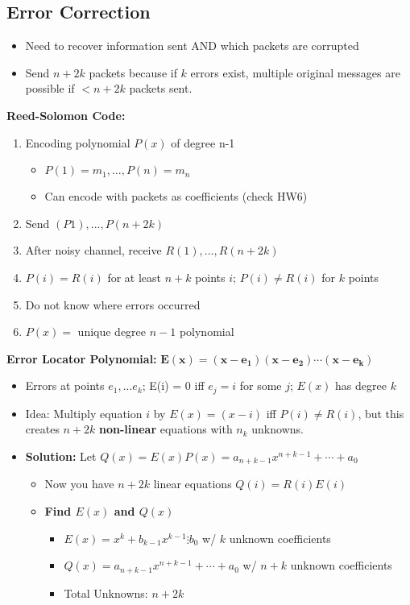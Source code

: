 \documentclass{article}\usepackage{amsmath,amssymb,amsthm,tikz,tkz-graph,color,chngpage,soul,hyperref,csquotes,graphicx,floatrow}\newcommand*{\QEDB}{\hfill\ensuremath{\square}}\newtheorem*{prop}{Proposition}\renewcommand{\theenumi}{\alph{enumi}}\usepackage[shortlabels]{enumitem}\usepackage[nobreak=true]{mdframed}\usetikzlibrary{matrix,calc}\MakeOuterQuote{"}\usepackage[margin=0.75in]{geometry} \newtheorem{theorem}{Theorem}
\begin{document}
\subsection*{Error Correction}
\begin{itemize}
\item Need to recover information sent AND which packets are corrupted
\item Send $n+2k$ packets because if $k$ errors exist, multiple original messages are possible if $< n+2k$ packets sent.
\end{itemize}
\begin{mdframed}
\textbf{Reed-Solomon Code:}
\begin{enumerate}[1.]
\item Encoding polynomial $P(x)$ of degree n-1
    \begin{itemize}
    \item $P(1) = m_1,..., P(n) = m_n$
    \item Can encode with packets as coefficients (check HW6)
    \end{itemize}
\item Send $(P1), ..., P(n+2k)$
\item After noisy channel, receive $R(1), ..., R(n+2k)$
\item $P(i) = R(i)$ for at least $n+k$ points $i$; $P(i) \ne R(i)$ for $k$ points
\item Do not know where errors occurred
\item $P(x) =$ unique degree $n-1$ polynomial
\end{enumerate}
\textbf{Error Locator Polynomial:} $\boldsymbol{E(x)=(x-e_1)(x-e_2)\cdots(x-e_k)}$
\begin{itemize}
\item Errors at points $e_1, ... e_k$; E(i) = 0 iff $e_j = i$ for some $j$; $E(x)$ has degree $k$
\item Idea: Multiply equation $i$ by $E(x) = (x - i)$ iff $P(i) \ne R(i)$, but this creates $n+2k$ \textbf{non-linear} equations with $n_k$ unknowns.
\item \textbf{Solution:} Let $Q(x) = E(x)P(x) = a_{n+k-1}x^{n+k-1} + \cdots + a_0$
    \begin{itemize}
    \item Now you have $n+2k$ linear equations $Q(i) = R(i)E(i)$
    \item \textbf{Find $E(x)$ and $Q(x)$}
        \begin{itemize}
            \item $E(x) = x^k+b_{k-1}x^{k-1}\vdots b_0$ w/ $k$ unknown coefficients
            \item $Q(x) = a_{n+k-1}x^{n+k-1} + \cdots + a_0$ w/ $n+k$ unknown coefficients
            \item Total Unknowns: $n+2k$
        \end{itemize}
    \end{itemize}
\end{itemize}
\end{mdframed}
\end{document}
